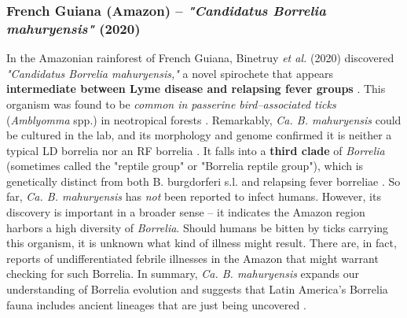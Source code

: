 \documentclass[11pt,letterpaper]{article}
\begin{document}
\subsubsection{French Guiana (Amazon) – \textit{"Candidatus Borrelia mahuryensis"} (2020)}
In the Amazonian rainforest of French Guiana, Binetruy \textit{et al.} (2020) discovered \textit{"Candidatus Borrelia mahuryensis,"} a novel spirochete that appears \textbf{intermediate between Lyme disease and relapsing fever groups} \citep{Binetruy2020b}. This organism was found to be \textit{common in passerine bird–associated ticks} (\textit{Amblyomma} spp.) in neotropical forests \citep{Binetruy2020c}. Remarkably, \textit{Ca. B. mahuryensis} could be cultured in the lab, and its morphology and genome confirmed it is neither a typical LD borrelia nor an RF borrelia \citep{Binetruy2020d}. It falls into a \textbf{third clade} of \textit{Borrelia} (sometimes called the "reptile group" or "Borrelia reptile group"), which is genetically distinct from both B. burgdorferi s.l. and relapsing fever borreliae \citep{Binetruy2020e, Binetruy2020f}. So far, \textit{Ca. B. mahuryensis} has \textit{not} been reported to infect humans. However, its discovery is important in a broader sense – it indicates the Amazon region harbors a high diversity of \textit{Borrelia}. Should humans be bitten by ticks carrying this organism, it is unknown what kind of illness might result. There are, in fact, reports of undifferentiated febrile illnesses in the Amazon that might warrant checking for such Borrelia. In summary, \textit{Ca. B. mahuryensis} expands our understanding of Borrelia evolution and suggests that Latin America's Borrelia fauna includes ancient lineages that are just being uncovered \citep{Binetruy2020g, Binetruy2020h}.
\end{document}
